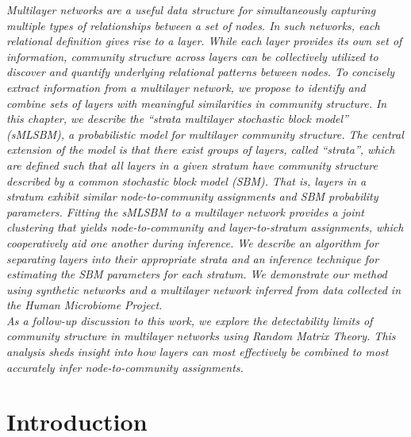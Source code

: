 \emph{Multilayer networks are a useful data structure for simultaneously capturing multiple types of relationships between a set of nodes. In such networks, each relational definition gives rise to a layer. While each layer provides its own set of information, community structure across layers can be collectively utilized to discover and quantify underlying relational patterns between nodes. To concisely extract information from a multilayer network, we propose to identify and combine sets of layers with meaningful similarities in community structure. In this chapter, we describe the ``strata multilayer stochastic block model'' (sMLSBM), a probabilistic model for multilayer community structure. The central extension of the model is that there exist groups of layers, called ``strata'', which are defined such that all layers in a given stratum have community structure described by a common stochastic block model (SBM). That is, layers in a stratum exhibit similar node-to-community assignments and SBM probability parameters. Fitting the sMLSBM to a multilayer network provides a joint clustering that yields node-to-community and layer-to-stratum assignments, which cooperatively aid one another during inference. We describe an algorithm for separating layers into their appropriate strata and an inference technique for estimating the SBM parameters for each stratum. We demonstrate our method using synthetic networks and a multilayer network inferred from data collected in the Human Microbiome Project.  \\
\indent As a follow-up discussion to this work, we explore the detectability limits of community structure in multilayer networks using Random Matrix Theory. This analysis sheds insight into how layers can most effectively be combined to most accurately infer node-to-community assignments. 
}
\section{Introduction}

